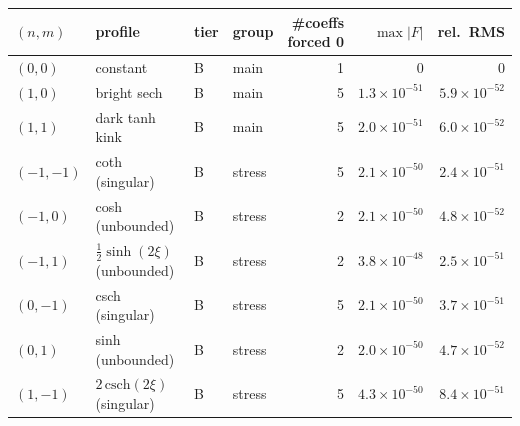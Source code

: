 \begin{tabular}{llllrrr}
\toprule
$(n,m)$ & profile & tier & group & \#coeffs forced 0 & $\max|F|$ & rel.\ RMS \\
\midrule
$(0,0)$ & constant & B & main & 1 & $0$ & $0$ \\
$(1,0)$ & bright sech & B & main & 5 & $1.3\times10^{-51}$ & $5.9\times10^{-52}$ \\
$(1,1)$ & dark tanh kink & B & main & 5 & $2.0\times10^{-51}$ & $6.0\times10^{-52}$ \\
$(-1,-1)$ & coth (singular) & B & stress & 5 & $2.1\times10^{-50}$ & $2.4\times10^{-51}$ \\
$(-1,0)$ & cosh (unbounded) & B & stress & 2 & $2.1\times10^{-50}$ & $4.8\times10^{-52}$ \\
$(-1,1)$ & $\tfrac12\sinh(2\xi)$ (unbounded) & B & stress & 2 & $3.8\times10^{-48}$ & $2.5\times10^{-51}$ \\
$(0,-1)$ & csch (singular) & B & stress & 5 & $2.1\times10^{-50}$ & $3.7\times10^{-51}$ \\
$(0,1)$ & sinh (unbounded) & B & stress & 2 & $2.0\times10^{-50}$ & $4.7\times10^{-52}$ \\
$(1,-1)$ & $2\,\mathrm{csch}(2\xi)$ (singular) & B & stress & 5 & $4.3\times10^{-50}$ & $8.4\times10^{-51}$ \\
\bottomrule
\end{tabular}